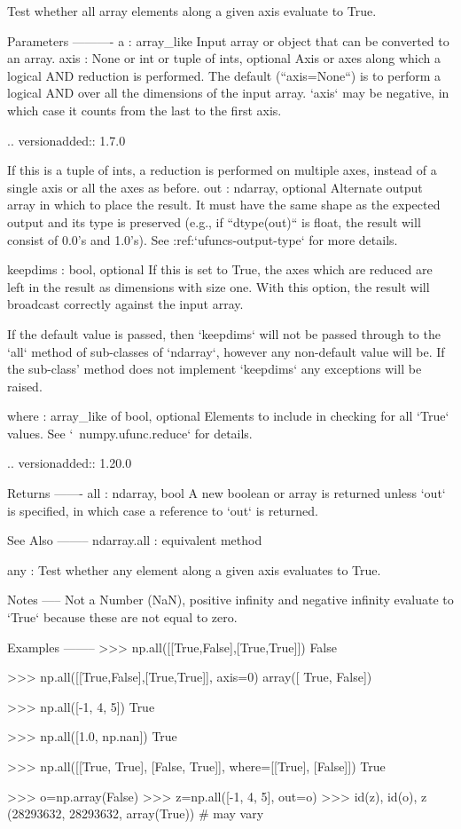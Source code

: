 \begin{DoxyVerb}Test whether all array elements along a given axis evaluate to True.

Parameters
----------
a : array_like
    Input array or object that can be converted to an array.
axis : None or int or tuple of ints, optional
    Axis or axes along which a logical AND reduction is performed.
    The default (``axis=None``) is to perform a logical AND over all
    the dimensions of the input array. `axis` may be negative, in
    which case it counts from the last to the first axis.

    .. versionadded:: 1.7.0

    If this is a tuple of ints, a reduction is performed on multiple
    axes, instead of a single axis or all the axes as before.
out : ndarray, optional
    Alternate output array in which to place the result.
    It must have the same shape as the expected output and its
    type is preserved (e.g., if ``dtype(out)`` is float, the result
    will consist of 0.0's and 1.0's). See :ref:`ufuncs-output-type` for more
    details.

keepdims : bool, optional
    If this is set to True, the axes which are reduced are left
    in the result as dimensions with size one. With this option,
    the result will broadcast correctly against the input array.

    If the default value is passed, then `keepdims` will not be
    passed through to the `all` method of sub-classes of
    `ndarray`, however any non-default value will be.  If the
    sub-class' method does not implement `keepdims` any
    exceptions will be raised.

where : array_like of bool, optional
    Elements to include in checking for all `True` values.
    See `~numpy.ufunc.reduce` for details.

    .. versionadded:: 1.20.0

Returns
-------
all : ndarray, bool
    A new boolean or array is returned unless `out` is specified,
    in which case a reference to `out` is returned.

See Also
--------
ndarray.all : equivalent method

any : Test whether any element along a given axis evaluates to True.

Notes
-----
Not a Number (NaN), positive infinity and negative infinity
evaluate to `True` because these are not equal to zero.

Examples
--------
>>> np.all([[True,False],[True,True]])
False

>>> np.all([[True,False],[True,True]], axis=0)
array([ True, False])

>>> np.all([-1, 4, 5])
True

>>> np.all([1.0, np.nan])
True

>>> np.all([[True, True], [False, True]], where=[[True], [False]])
True

>>> o=np.array(False)
>>> z=np.all([-1, 4, 5], out=o)
>>> id(z), id(o), z
(28293632, 28293632, array(True)) # may vary\end{DoxyVerb}
